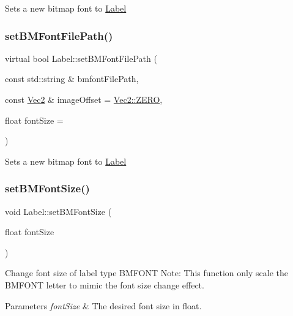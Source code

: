 Sets a new bitmap font to \hyperlink{classLabel}{Label} \mbox{\label{classLabel_a8fc5d958c2fd664a13c6bd80cde77dba}} 
\subsubsection{\texorpdfstring{set\+B\+M\+Font\+File\+Path()}{setBMFontFilePath()}\hspace{0.1cm}{\footnotesize\ttfamily [2/2]}}
{\footnotesize\ttfamily virtual bool Label\+::set\+B\+M\+Font\+File\+Path (\begin{DoxyParamCaption}\item[{const std\+::string \&}]{bmfont\+File\+Path,  }\item[{const \hyperlink{classVec2}{Vec2} \&}]{image\+Offset = {\ttfamily \hyperlink{classVec2_a5c80e2e7c8bd2adcbad2844d060e6245}{Vec2\+::\+Z\+E\+RO}},  }\item[{float}]{font\+Size = {} }\end{DoxyParamCaption})\hspace{0.3cm}{\ttfamily [virtual]}}

Sets a new bitmap font to \hyperlink{classLabel}{Label} \mbox{\label{classLabel_a3d5451ed32ff33ef8de937ace917531d}} 
\subsubsection{\texorpdfstring{set\+B\+M\+Font\+Size()}{setBMFontSize()}\hspace{0.1cm}{\footnotesize\ttfamily [1/2]}}
{\footnotesize\ttfamily void Label\+::set\+B\+M\+Font\+Size (\begin{DoxyParamCaption}\item[{float}]{font\+Size }\end{DoxyParamCaption})}

Change font size of label type B\+M\+F\+O\+NT Note\+: This function only scale the B\+M\+F\+O\+NT letter to mimic the font size change effect.


\begin{DoxyParams}{Parameters}
{\em font\+Size} & The desired font size in float. \\
\hline
\end{DoxyParams}
\mbox{\label{classLabel_a3d5451ed32ff33ef8de937ace917531d}} 
